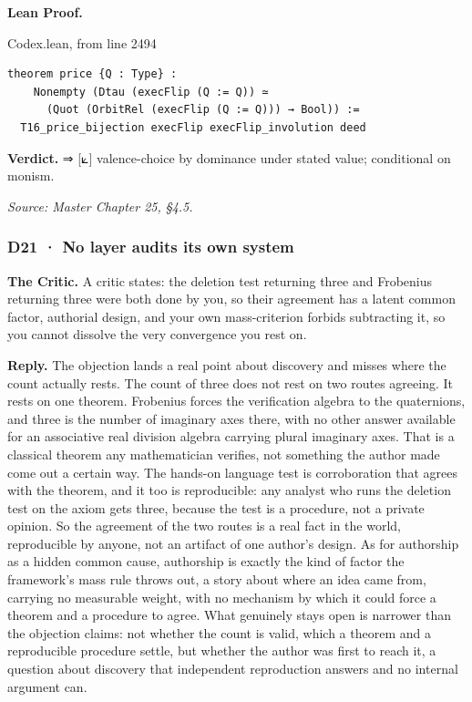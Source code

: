 \documentclass[10pt,twocolumn]{article}
\begin{document}
\textbf{Lean Proof.}

\begin{leanexcerpt}{Codex.lean, from line 2494}
\begin{lstlisting}[style=leanx,firstnumber=2494]
theorem price {Q : Type} :
    Nonempty (Dtau (execFlip (Q := Q)) ≃
      (Quot (OrbitRel (execFlip (Q := Q))) → Bool)) :=
  T16_price_bijection execFlip execFlip_involution deed
\end{lstlisting}
\end{leanexcerpt}

\textbf{Verdict.} ⇒ {[}⟀{]} valence-choice by dominance under stated
value; conditional on monism.

\emph{Source: Master Chapter 25, §4.5.}

\hypertarget{d21-no-layer-audits-its-own-system}{%
\subsubsection{D21 · No layer audits its own
system}\label{d21-no-layer-audits-its-own-system}}

\textbf{The Critic.} A critic states: the deletion test returning three
and Frobenius returning three were both done by you, so their agreement
has a latent common factor, authorial design, and your own
mass-criterion forbids subtracting it, so you cannot dissolve the very
convergence you rest on.

\textbf{Reply.} The objection lands a real point about discovery and
misses where the count actually rests. The count of three does not rest
on two routes agreeing. It rests on one theorem. Frobenius forces the
verification algebra to the quaternions, and three is the number of
imaginary axes there, with no other answer available for an associative
real division algebra carrying plural imaginary axes. That is a
classical theorem any mathematician verifies, not something the author
made come out a certain way. The hands-on language test is corroboration
that agrees with the theorem, and it too is reproducible: any analyst
who runs the deletion test on the axiom gets three, because the test is
a procedure, not a private opinion. So the agreement of the two routes
is a real fact in the world, reproducible by anyone, not an artifact of
one author's design. As for authorship as a hidden common cause,
authorship is exactly the kind of factor the framework's mass rule
throws out, a story about where an idea came from, carrying no
measurable weight, with no mechanism by which it could force a theorem
and a procedure to agree. What genuinely stays open is narrower than the
objection claims: not whether the count is valid, which a theorem and a
reproducible procedure settle, but whether the author was first to reach
it, a question about discovery that independent reproduction answers and
no internal argument can.
\end{document}
